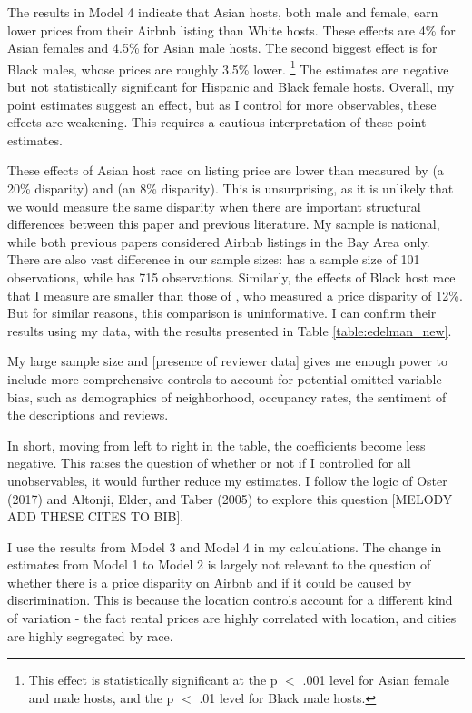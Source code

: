 The results in Model 4 indicate that Asian hosts, both male and female, earn lower prices from their Airbnb listing than White hosts. These effects are 4\% for Asian females and 4.5\% for Asian male hosts. The second biggest effect is for Black males, whose prices are roughly 3.5\% lower.%
	\footnote{This effect is statistically significant at the p $<$ .001 level for Asian female and male hosts, and the p $<$ .01 level for Black male hosts.} 
The estimates are negative but not statistically significant for Hispanic and Black female hosts. Overall, my point estimates suggest an effect, but as I control for more observables, these effects are weakening. This requires a cautious interpretation of these point estimates. 

These effects of Asian host race on listing price are lower than measured by \cite{wang} (a 20\% disparity) and \cite{kakar} (an 8\% disparity). This is unsurprising, as it is unlikely that we would measure the same disparity when there are important structural differences between this paper and previous literature. My sample is national, while both previous papers considered Airbnb listings in the Bay Area only. There are also vast difference in our sample sizes: \cite{wang} has a sample size of 101 observations, while \cite{kakar} has 715 observations. Similarly, the effects of Black host race that I measure are smaller than those of \cite{edelman}, who measured a price disparity of 12\%. But for similar reasons, this comparison is uninformative. I can confirm their results using my data, with the results presented in Table \ref{table:edelman_new}. 

My large sample size and [presence of reviewer data] gives me enough power to include more comprehensive controls to account for potential omitted variable bias, such as demographics of neighborhood, occupancy rates, the sentiment of the descriptions and reviews. 

In short, moving from left to right in the table, the coefficients become less negative. This raises the question of whether or not if I controlled for all unobservables, it would further reduce my estimates. I follow the logic of Oster (2017) and Altonji, Elder, and Taber (2005) to explore this question [MELODY ADD THESE CITES TO BIB].

I use the results from Model 3 and Model 4 in my calculations. The change in estimates from Model 1 to Model 2 is largely not relevant to the question of whether there is a price disparity on Airbnb and if it could be caused by discrimination. This is because the location controls account for a different kind of variation - the fact rental prices are highly correlated with location, and cities are highly segregated by race. 

